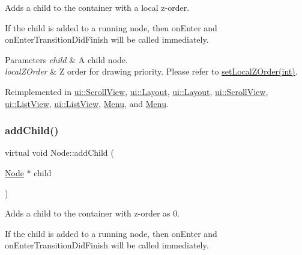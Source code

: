Adds a child to the container with a local z-\/order.

If the child is added to a \textquotesingle{}running\textquotesingle{} node, then \textquotesingle{}on\+Enter\textquotesingle{} and \textquotesingle{}on\+Enter\+Transition\+Did\+Finish\textquotesingle{} will be called immediately.


\begin{DoxyParams}{Parameters}
{\em child} & A child node. \\
\hline
{\em local\+Z\+Order} & Z order for drawing priority. Please refer to {\ttfamily \hyperlink{classNode_aee4e616c2d55b722226aae1e68b4946f}{set\+Local\+Z\+Order(int)}}. \\
\hline
\end{DoxyParams}


Reimplemented in \hyperlink{classui_1_1ScrollView_acfd1b4932c3926cf777ef00235c3386b}{ui\+::\+Scroll\+View}, \hyperlink{classui_1_1Layout_aa9947ec25c709fa839fdec1795ae2a2c}{ui\+::\+Layout}, \hyperlink{classui_1_1Layout_a0ba6f93abe0d74d31d08147339952e19}{ui\+::\+Layout}, \hyperlink{classui_1_1ScrollView_a42849e8b7b80ca0bcee880f40de9eccd}{ui\+::\+Scroll\+View}, \hyperlink{classui_1_1ListView_afb7109d348b36c0d672066589ef1e00b}{ui\+::\+List\+View}, \hyperlink{classui_1_1ListView_a36ef7247ab78ee7019eca8c409a30356}{ui\+::\+List\+View}, \hyperlink{classMenu_a196fa8d0852b67ab63f7d3937c9b7d1c}{Menu}, and \hyperlink{classMenu_a38455f79cd083475d9beacf0cc9caf81}{Menu}.

\mbox{\label{classNode_aa3e5ddb38e23ee7763d623f2d943b004}} 
\subsubsection{\texorpdfstring{add\+Child()}{addChild()}\hspace{0.1cm}{\footnotesize\ttfamily [3/8]}}
{\footnotesize\ttfamily virtual void Node\+::add\+Child (\begin{DoxyParamCaption}\item[{\hyperlink{classNode}{Node} $\ast$}]{child }\end{DoxyParamCaption})\hspace{0.3cm}{\ttfamily [virtual]}}

Adds a child to the container with z-\/order as 0.

If the child is added to a \textquotesingle{}running\textquotesingle{} node, then \textquotesingle{}on\+Enter\textquotesingle{} and \textquotesingle{}on\+Enter\+Transition\+Did\+Finish\textquotesingle{} will be called immediately.


